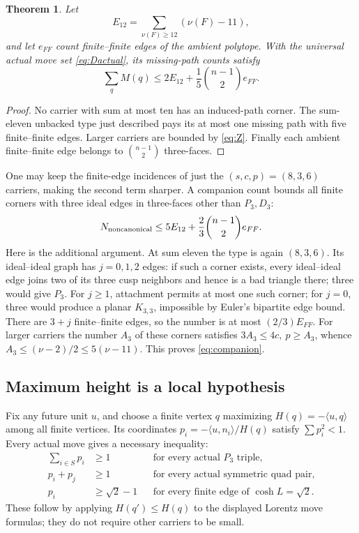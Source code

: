\documentclass[11pt]{article}
\newtheorem{theorem}{Theorem}[section]
\theoremstyle{definition}\newtheorem{definition}[theorem]{Definition}
\theoremstyle{remark}\newtheorem{remark}[theorem]{Remark}
\newcommand{\ip}[2]{\langle #1,#2\rangle}
\newcommand{\nuu}{\nu}
\newcommand{\Pthree}{P_3}
\newcommand{\Dthree}{D_3}
\newcommand{\bin}[2]{\binom{#1}{#2}}
\begin{document}
\begin{theorem}\label{thm:charge}
Let
\[
 E_{12}=\sum_{\nuu(F)\ge12}(\nuu(F)-11),
\]
and let \(e_{FF}\) count finite--finite edges of the ambient
polytope. With the universal actual move set
\eqref{eq:Dactual}, its missing-path counts satisfy
\begin{equation}\label{eq:charge}
 \sum_q M(q)\le2E_{12}
       +\frac15\bin{n-1}{2}e_{FF}.
\end{equation}
\end{theorem}
\begin{proof}
No carrier with sum at most ten has an induced-path corner.
The sum-eleven unbacked type just described pays its at most one
missing path with five finite--finite edges. Larger carriers are
bounded by \eqref{eq:Z}. Finally each ambient finite--finite edge
belongs to \(\bin{n-1}{2}\) three-faces.
\end{proof}

One may keep the finite-edge incidences of just the
\((s,c,p)=(8,3,6)\) carriers, making the second term sharper.
A companion count bounds all finite corners with three ideal edges
in three-faces other than \(\Pthree,\Dthree\):
\begin{equation}\label{eq:companion}
 N_{\rm noncanonical}\le
 5E_{12}+\frac23\bin{n-1}{2}e_{FF}.
\end{equation}
Here is the additional argument. At sum eleven the type is again
\((8,3,6)\). Its ideal--ideal graph has \(j=0,1,2\) edges:
if such a corner exists, every ideal--ideal edge joins two of its
three cusp neighbors and hence is a bad triangle there; three would
give \(\Pthree\). For \(j\ge1\), attachment permits at most
one such corner; for \(j=0\), three would produce a planar
\(K_{3,3}\), impossible by Euler's bipartite edge bound.
There are \(3+j\) finite--finite edges, so the number is at most
\((2/3)E_{FF}\). For larger carriers the number \(A_3\) of
these corners satisfies \(3A_3\le4c,\ p\ge A_3\), whence
\(A_3\le(\nuu-2)/2\le5(\nuu-11)\).
This proves \eqref{eq:companion}.

\subsection{Maximum height is a local hypothesis}
Fix any future unit \(u\), and choose a finite vertex \(q\) maximizing
\(H(q)=-\ip{u}{q}\) among all finite vertices. Its coordinates
\(p_i=-\ip{u}{n_i}/H(q)\) satisfy \(\sum p_i^2<1\).
Every actual move gives a necessary inequality:
\begin{align}
 \sum_{i\in S}p_i&\ge1
       &&\text{for every actual \(\Pthree\) triple},\label{eq:maxtri}\\
 p_i+p_j&\ge1
       &&\text{for every actual symmetric quad pair},\label{eq:maxquad}\\
 p_i&\ge\sqrt2-1
       &&\text{for every finite edge of \(\cosh L=\sqrt2\)}.
       \label{eq:maxedge}
\end{align}
These follow by applying \(H(q')\le H(q)\) to the displayed
Lorentz move formulas; they do not require other carriers to be small.
\end{document}

